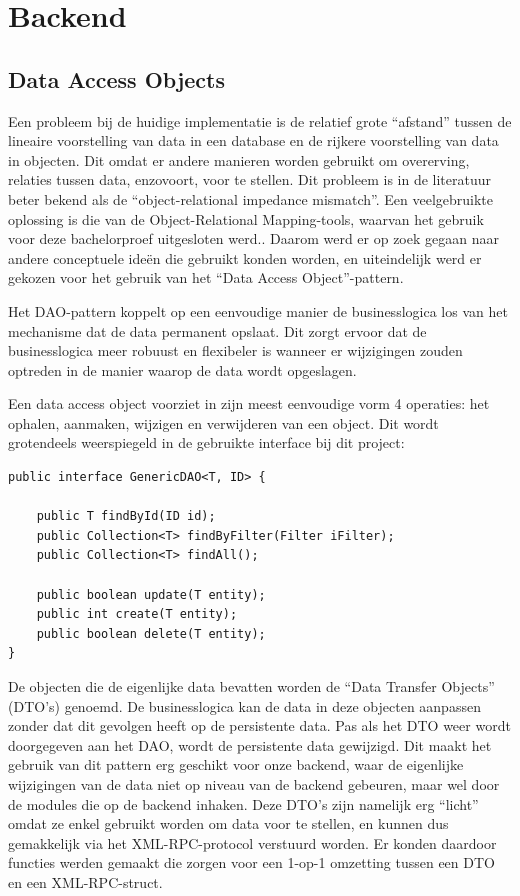 %
%

\chapter{Backend}

\section{Data Access Objects}

Een probleem bij de huidige implementatie is de relatief grote ``afstand'' tussen de lineaire voorstelling van data in een database en de rijkere voorstelling van data in objecten. Dit omdat er andere manieren worden gebruikt om overerving, relaties tussen data, enzovoort, voor te stellen. Dit probleem is in de literatuur beter bekend als de ``object-relational impedance mismatch''. Een veelgebruikte oplossing is die van de Object-Relational Mapping-tools, waarvan het gebruik voor deze bachelorproef uitgesloten werd.. Daarom werd er op zoek gegaan naar andere conceptuele ide\"en die gebruikt konden worden, en uiteindelijk werd er gekozen voor het gebruik van het ``Data Access Object''-pattern.

Het DAO-pattern koppelt op een eenvoudige manier de businesslogica los van het mechanisme dat de data permanent opslaat. Dit zorgt ervoor dat de businesslogica meer robuust en flexibeler is wanneer er wijzigingen zouden optreden in de manier waarop de data wordt opgeslagen.

Een data access object voorziet in zijn meest eenvoudige vorm 4 operaties: het ophalen, aanmaken, wijzigen en verwijderen van een object. Dit wordt grotendeels weerspiegeld in de gebruikte interface bij dit project:

\lstset{language=Java,style=Java}
\begin{lstlisting}
public interface GenericDAO<T, ID> {

    public T findById(ID id);
    public Collection<T> findByFilter(Filter iFilter);
    public Collection<T> findAll();

    public boolean update(T entity);
    public int create(T entity);
    public boolean delete(T entity);
}
\end{lstlisting}

De objecten die de eigenlijke data bevatten worden de ``Data Transfer Objects'' (DTO's) genoemd. De businesslogica kan de data in deze objecten aanpassen zonder dat dit gevolgen heeft op de persistente data. Pas als het DTO weer wordt doorgegeven aan het DAO, wordt de persistente data gewijzigd. Dit maakt het gebruik van dit pattern erg geschikt voor onze backend, waar de eigenlijke wijzigingen van de data niet op niveau van de backend gebeuren, maar wel door de modules die op de backend inhaken. Deze DTO's zijn namelijk erg ``licht'' omdat ze enkel gebruikt worden om data voor te stellen, en kunnen dus gemakkelijk via het XML-RPC-protocol verstuurd worden. Er konden daardoor functies werden gemaakt die zorgen voor een 1-op-1 omzetting tussen een DTO en een XML-RPC-struct.

